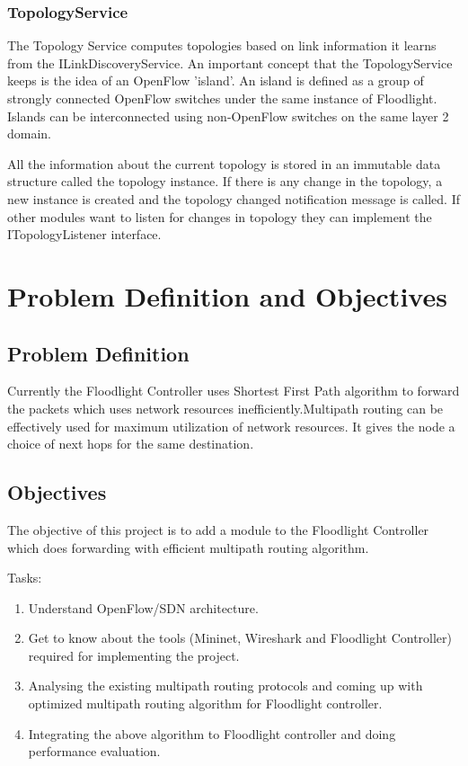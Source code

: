 \documentclass[12pt,a4paper]{article}
\begin{document}
\subsubsection{TopologyService}
The Topology Service computes topologies based on link information it learns from the ILinkDiscoveryService. An important concept that the TopologyService keeps is the idea of an OpenFlow 'island'. An island is defined as a group of strongly connected OpenFlow switches under the same instance of Floodlight. Islands can be interconnected using non-OpenFlow switches on the same layer 2 domain. 



All the information about the current topology is stored in an immutable data structure called the topology instance. If there is any change in the topology, a new instance is created and the topology changed notification message is called. If other modules want to listen for changes in topology they can implement the ITopologyListener interface.




\newpage


\section{Problem Definition and Objectives}

\subsection{Problem Definition}
Currently the Floodlight Controller uses Shortest First Path algorithm to forward the
packets which uses network resources inefficiently.Multipath routing can be effectively used for maximum utilization of network resources. It gives
the node a choice of next hops for the same destination.

\subsection{Objectives}
The objective of this project is to add a module to the Floodlight Controller which does forwarding with efficient multipath routing algorithm.

Tasks:
\begin{enumerate}
\item Understand OpenFlow/SDN architecture.
\item Get to know about the tools (Mininet, Wireshark and Floodlight Controller) required for implementing the project.
\item Analysing the existing multipath routing protocols and coming up with optimized multipath routing algorithm for Floodlight controller.

\item Integrating the above algorithm to Floodlight controller and doing performance evaluation.


\end{enumerate}
\newpage
\end{document}
